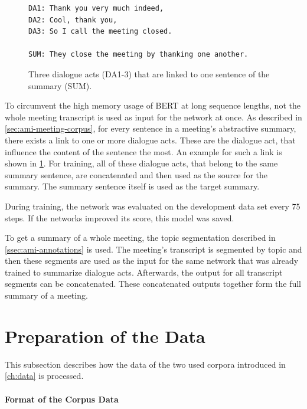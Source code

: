 \begin{figure}[h]
\begin{lstlisting}[numbers=none]
DA1: Thank you very much indeed,
DA2: Cool, thank you,
DA3: So I call the meeting closed.

SUM: They close the meeting by thanking one another.
\end{lstlisting}
\caption{Three dialogue acts (DA1-3) that are linked to one sentence of the summary (SUM).}
\label{fig:dialogue-arc-summary-link-example}
\end{figure}

To circumvent the high memory usage of BERT at long sequence lengths, not the whole meeting transcript is used as input for the network at once.
As described in \cref{sec:ami-meeting-corpus}, for every sentence in a meeting's abstractive summary, there exists a link to one or more dialogue acts.
These are the dialogue act, that influence the content of the sentence the most.
An example for such a link is shown in \cref{fig:dialogue-arc-summary-link-example}.
For training, all of these dialogue acts, that belong to the same summary sentence, are concatenated and then used as the source for the summary.
The summary sentence itself is used as the target summary.

During training, the network was evaluated on the development data set every 75 steps.
If the networks improved its score, this model was saved.

To get a summary of a whole meeting, the topic segmentation described in \cref{ssec:ami-annotations} is used.
The meeting's transcript is segmented by topic and then these segments are used as the input for the same network that was already trained to summarize dialogue acts.
Afterwards, the output for all transcript segments can be concatenated.
These concatenated outputs together form the full summary of a meeting. 

\section{Preparation of the Data}\label{sec:preparation-of-the-data}

This subsection describes how the data of the two used corpora introduced in \cref{ch:data} is processed.

\paragraph{Format of the Corpus Data}

